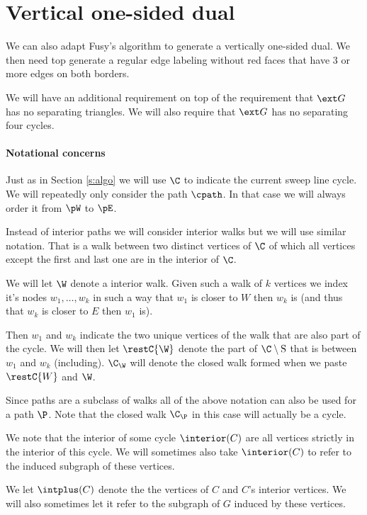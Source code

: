 

\section{Vertical one-sided dual}
\label{s:red}

We can also adapt Fusy's algorithm to generate a vertically one-sided dual. We then need top generate a regular edge labeling without red faces that have $3$ or more edges on both borders.

We will have an additional requirement on top of the requirement that $\ext G$ has no separating triangles. We will also require that $\ext G$ has no separating four cycles.


\paragraph{Notational concerns}
  Just as in Section \ref{s:algo} we will use $\C$ to indicate the current sweep line cycle.
  We will repeatedly only consider the path $\cpath$. In that case we will always order it from $\pW$ to $\pE$.

  Instead of interior paths we will consider interior walks but we will use similar notation. That is a walk between two distinct vertices of $\C$ of which all vertices except the first and last one are in the interior of $\C$.

  We will let $\W$ denote a interior walk. Given such a walk of $k$ vertices we index it's nodes $w_1, \ldots, w_k$  in such a way that $w_1$ is closer to $W$ then $w_k$ is (and thus that $w_k$ is closer to $E$ then $w_1$ is).

  Then $w_1$ and $w_k$ indicate the two unique vertices of the walk that are also part of the cycle. We will then let $\restC{\W}$ denote the part of $\C\setminus {\mathrm{S}}$ that is between $w_1$ and $w_k$ (including). $\C_\W$ will denote the closed walk formed when we paste $\restC{W}$ and $\W$.

  Since paths are a subclass of walks all of the above notation can also be used for a path $\P$. Note that the closed walk $\C_\P$ in this case will actually be a cycle.


  We note that the interior of some cycle $\interior(C)$ are all vertices strictly in the interior of this cycle. We will sometimes also take $\interior(C)$ to refer to the induced subgraph of these vertices.

  We let $\intplus(C)$ denote the the vertices of $C$ and $C$'s interior vertices. We will also sometimes let it refer to the subgraph of $G$ induced by these vertices.

